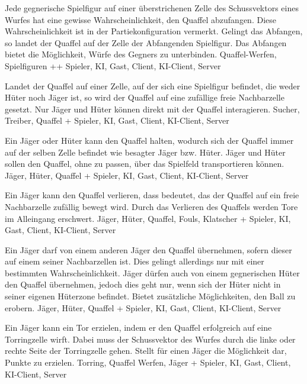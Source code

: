         {Jede gegnerische Spielfigur auf einer überstrichenen Zelle des Schussvektors eines Wurfes hat eine gewisse Wahrscheinlichkeit, den Quaffel abzufangen. Diese Wahrscheinlichkeit ist in der Partiekonfiguration vermerkt. Gelingt das Abfangen, so landet der Quaffel auf der Zelle der Abfangenden Spielfigur.}
        {Das Abfangen bietet die Möglichkeit, Würfe des Gegners zu unterbinden.}
        {Quaffel-Werfen, Spielfiguren }
        {++}
        {Spieler, KI, Gast, Client, KI-Client, Server}
        
        {Landet der Quaffel auf einer Zelle, auf der sich eine Spielfigur befindet, die weder Hüter noch Jäger ist, so wird der Quaffel auf eine zufällige freie Nachbarzelle gesetzt.}
        {Nur Jäger und Hüter können direkt mit der Quaffel interagieren.}
        {Sucher, Treiber, Quaffel}
        {+}
        {Spieler, KI, Gast, Client, KI-Client, Server}		
        
        {Ein Jäger oder Hüter kann den Quaffel halten, wodurch sich der Quaffel immer auf der selben Zelle befindet wie besagter Jäger bzw. Hüter.}
        {Jäger und Hüter sollen den Quaffel, ohne zu passen, über das Spielfeld transportieren können.}
        {Jäger, Hüter, Quaffel}
        {+}
        {Spieler, KI, Gast, Client, KI-Client, Server}	
        
        {Ein Jäger kann den Quaffel verlieren, dass bedeutet, das der Quaffel auf ein freie Nachbarzelle zufällig bewegt wird.}
        {Durch das Verlieren des Quaffels werden Tore im Alleingang erschwert.}
        {Jäger, Hüter, Quaffel, Fouls, Klatscher}
        {+}
        {Spieler, KI, Gast, Client, KI-Client, Server}
    
        {Ein Jäger darf von einem anderen Jäger den Quaffel übernehmen, sofern dieser auf einem seiner Nachbarzellen ist. Dies gelingt allerdings nur mit einer bestimmten Wahrscheinlichkeit. Jäger dürfen auch von einem gegnerischen Hüter den Quaffel übernehmen, jedoch dies geht nur, wenn sich der Hüter nicht in seiner eigenen Hüterzone befindet.}
        {Bietet zusätzliche Möglichkeiten, den Ball zu erobern.}
        {Jäger, Hüter, Quaffel}
        {+}
        {Spieler, KI, Gast, Client, KI-Client, Server}

        {Ein Jäger kann ein Tor erzielen, indem er den Quaffel erfolgreich auf eine Torringzelle wirft. Dabei muss der Schussvektor des Wurfes durch die linke oder rechte Seite der Torringzelle gehen.}
        {Stellt für einen Jäger die Möglichkeit dar, Punkte zu erzielen.}
        {Torring, Quaffel Werfen, Jäger}
        {+}
        {Spieler, KI, Gast, Client, KI-Client, Server}
        
